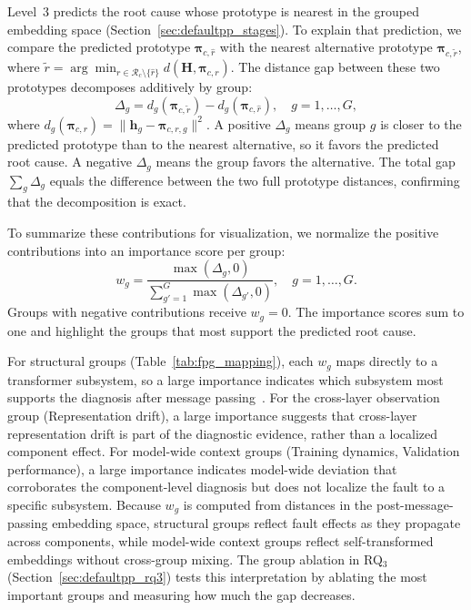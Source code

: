 Level~3 predicts the root cause whose prototype is nearest in the grouped embedding space (Section~\ref{sec:defaultpp_stages}). To explain that prediction, we compare the predicted prototype $\symbf{\pi}_{c,\hat{r}}$ with the nearest alternative prototype $\symbf{\pi}_{c,\tilde{r}}$, where $\tilde{r} = \arg\min_{r \in \mathcal{R}_c \setminus \{\hat{r}\}} d(\mathbf{H}, \symbf{\pi}_{c,r})$. The distance gap between these two prototypes decomposes additively by group:
\begin{equation}
\Delta_g = d_g(\symbf{\pi}_{c,\tilde{r}}) - d_g(\symbf{\pi}_{c,\hat{r}}), \quad g = 1, \ldots, G,
\label{eq:group_contribution}
\end{equation}
where $d_g(\symbf{\pi}_{c,r}) = \| \mathbf{h}_g - \symbf{\pi}_{c,r,g} \|^2$. A positive $\Delta_g$ means group $g$ is closer to the predicted prototype than to the nearest alternative, so it favors the predicted root cause. A negative $\Delta_g$ means the group favors the alternative. The total gap $\sum_g \Delta_g$ equals the difference between the two full prototype distances, confirming that the decomposition is exact.

To summarize these contributions for visualization, we normalize the positive contributions into an importance score per group:
\begin{equation}
w_g = \frac{\max(\Delta_g, 0)}{\sum_{g'=1}^{G} \max(\Delta_{g'}, 0)}, \quad g = 1, \ldots, G.
\label{eq:explanation}
\end{equation}
Groups with negative contributions receive $w_g = 0$. The importance scores sum to one and highlight the groups that most support the predicted root cause.

For structural groups (Table~\ref{tab:fpg_mapping}), each $w_g$ maps directly to a transformer subsystem, so a large importance indicates which subsystem most supports the diagnosis after message passing~\cite{wolf2024keep}. For the cross-layer observation group (Representation drift), a large importance suggests that cross-layer representation drift is part of the diagnostic evidence, rather than a localized component effect. For model-wide context groups (Training dynamics, Validation performance), a large importance indicates model-wide deviation that corroborates the component-level diagnosis but does not localize the fault to a specific subsystem. Because $w_g$ is computed from distances in the post-message-passing embedding space, structural groups reflect fault effects as they propagate across components, while model-wide context groups reflect self-transformed embeddings without cross-group mixing. The group ablation in RQ$_3$ (Section~\ref{sec:defaultpp_rq3}) tests this interpretation by ablating the most important groups and measuring how much the gap decreases.


